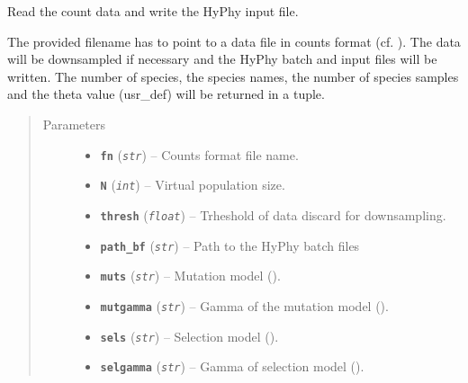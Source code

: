 \documentclass[letterpaper,10pt,english]{sphinxmanual}
\begin{document}
\begin{fulllineitems}
\label{main:libPoMo.main.read_data_write_HyPhy_input}
Read the count data and write the HyPhy input file.

The provided filename has to point to a data file in counts format
(cf. {\hyperref[cf::doc]{}}).  The data will be downsampled if necessary
and the HyPhy batch and input files will be written.  The number
of species, the species names, the number of species samples and
the theta value (usr\_def) will be returned in a tuple.
\begin{quote}\begin{description}
\item[{Parameters}] \leavevmode\begin{itemize}
\item {} 
\textbf{\texttt{fn}} (\emph{\texttt{str}}) -- Counts format file name.

\item {} 
\textbf{\texttt{N}} (\emph{\texttt{int}}) -- Virtual population size.

\item {} 
\textbf{\texttt{thresh}} (\emph{\texttt{float}}) -- Trheshold of data discard for downsampling.

\item {} 
\textbf{\texttt{path\_bf}} (\emph{\texttt{str}}) -- Path to the HyPhy batch files

\item {} 
\textbf{\texttt{muts}} (\emph{\texttt{str}}) -- Mutation model ({\hyperref[main:libPoMo.main.mutModel]{}}).

\item {} 
\textbf{\texttt{mutgamma}} (\emph{\texttt{str}}) -- Gamma of the mutation model ({\hyperref[main:libPoMo.main.setGM]{}}).

\item {} 
\textbf{\texttt{sels}} (\emph{\texttt{str}}) -- Selection model ({\hyperref[main:libPoMo.main.selModel]{}}).

\item {} 
\textbf{\texttt{selgamma}} (\emph{\texttt{str}}) -- Gamma of selection model ({\hyperref[main:libPoMo.main.setGS]{}}).


\end{itemize}
\end{description}
\end{quote}
\end{fulllineitems}
\end{document}
